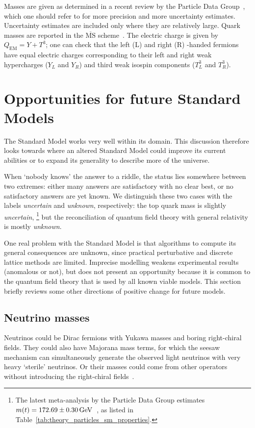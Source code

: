 \begin{table}[tp]
{Masses are given as determined in a recent review by the
Particle Data Group~\cite{pdg2022ynf}, which one should refer to for more
precision and more uncertainty estimates.
Uncertainty estimates are included only where they are relatively large.
Quark masses are reported in the $\overline{\mathrm{MS}}$ scheme~\cite{
pdg2022ynf,
PhysRevD.18.3998
}.
The electric charge is given by $Q_{\mathrm{EM}} = Y + T^3$; one can check
that the left (L) and right (R) -handed fermions have equal electric charges
corresponding to their left and right weak hypercharges ($Y_L$ and $Y_R$)
and third weak isospin components ($T^3_L$ and $T^3_R$).
}
\label{tab:theory_particles_sm_properties}
\end{table}


\section{Opportunities for future Standard Models}
The Standard Model works very well within its domain.
This discussion therefore looks towards where an altered Standard Model could
improve its current abilities or to expand its generality to describe more of
the universe.

When `nobody knows' the answer to a riddle, the status lies somewhere between
two extremes:
either many answers are satisfactory with no clear best,
or no satisfactory answers are yet known.
We distinguish these two cases with the labels
\emph{uncertain} and \emph{unknown}, respectively:
the top quark mass is slightly \emph{uncertain},%
\footnote{%
The latest meta-analysis by the Particle Data Group estimates
$m(t) = 172.69 \pm 0.30\,\eV[G]$~\cite{pdg2022ynf}, as listed in
Table~\ref{tab:theory_particles_sm_properties}.
}
but the reconciliation of quantum field theory with general relativity is
mostly \emph{unknown}.

One real problem with the Standard Model is that algorithms to compute its
general consequences are unknown, since practical perturbative and discrete
lattice methods are limited.
Imprecise modelling weakens experimental results (anomalous or not),
but does not present an opportunity because it is common to the quantum field
theory that is used by all known viable models.
This section briefly reviews some other directions of positive change for
future models.


\subsection{Neutrino masses}
Neutrinos could be Dirac fermions with Yukawa masses and boring right-chiral
fields.
They could also have Majorana mass terms, for which the seesaw mechanism can
simultaneously generate the observed light neutrinos with very heavy `sterile'
neutrinos.
Or their masses could come from other operators without  introducing the
right-chiral fields~\cite{
thomson2013modern,
chala2021neutrino,
wells2020discovery
}.

